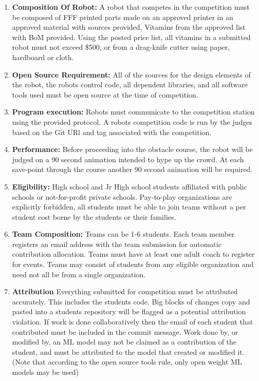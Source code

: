 \documentclass{article}
\begin{document}
\begin{enumerate}
	
\item \textbf{Composition Of Robot:} A robot that competes in the competition must be composed of FFF printed parts made on an approved printer in an approved material with sources provided, Vitamins from the approved list with BoM provided. Using the posted price list, all vitamins in a submitted robot must not exceed \$500, or from a drag-knife cutter using paper, hardboard or cloth. 

\item \textbf{Open Source Requirement:} All of the sources for the design elements of the robot, the robots control code, all dependent libraries, and all software tools used must be open source at the time of competition. 

\item \textbf{Program execution:} Robots must communicate to the competition station using the provided protocol. A robots competition code is run by the judges based on the Git URl and tag associated with the competition. 


\item \textbf{Performance:} Before proceeding into the obstacle course, the robot will be judged on a 90 second animation intended to hype up the crowd. At each save-point through the course another 90 second animation will be required. 

\item \textbf{Eligibility:} High school and Jr High school students affiliated with public schools or not-for-profit private schools. Pay-to-play organizations are explicitly forbidden, all students must be able to join teams without a per student cost borne by the students or their families. 


\item \textbf{Team Composition:} Teams can be 1-6 students. Each team member registers an email address with the team submission for automatic contribution allocation. Teams must have at least one adult coach to register for events. Teams may consist of students from any eligible organization and need not all be from a single organization.  

 
\item \textbf{Attribution} Everything submitted for competition must be attributed accurately. This includes the students code. Big blocks of changes copy and pasted into a students repository will be flagged as a potential attribution violation. If work is done collaboratively then the email of each student that contributed must be included in the commit message. Work done by, or modified by, an ML model may not be claimed as a contribution of the student, and must be attributed to the model that created or modified it. (Note that according to the open source tools rule, only open weight ML models may be used)




\end{enumerate}
\end{document}
